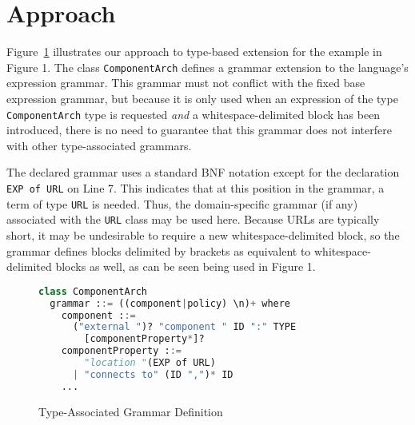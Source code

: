 \section{Approach}
\label{s:approach}

Figure~\ref{f:dsl-if} illustrates our approach to type-based extension for the example in Figure 1.  The class \verb|ComponentArch| defines a grammar extension to the language's expression grammar. This grammar must not conflict with the fixed base expression grammar, but because it is only used when an expression of the type \verb|ComponentArch| type is requested \emph{and} a whitespace-delimited block has been introduced, there is no need to guarantee that this grammar does not interfere with other type-associated grammars. 

The declared grammar uses a standard BNF notation except for the declaration \verb|EXP of URL| on Line 7. This indicates that at this position in the grammar, a term of type \verb|URL| is needed. Thus, the domain-specific grammar (if any) associated with the \verb|URL| class may be used here. Because URLs are typically short, it may be undesirable to require a new whitespace-delimited block, so the grammar defines blocks delimited by brackets as equivalent to whitespace-delimited blocks as well, as can be seen being used in Figure 1.

\begin{figure}
  \centering\small
  \begin{lstlisting}[language=Python,morekeywords={grammar,where,ID,TYPE,EXP}]
class ComponentArch
  grammar ::= ((component|policy) \n)+ where 
    component ::= 
      ("external ")? "component " ID ":" TYPE
        [componentProperty*]?
    componentProperty ::= 
        "location "(EXP of URL)
      | "connects to" (ID ",")* ID
    ...
  \end{lstlisting}
  \caption{Type-Associated Grammar Definition}
  \label{f:dsl-if}
\end{figure}

%
%
%
